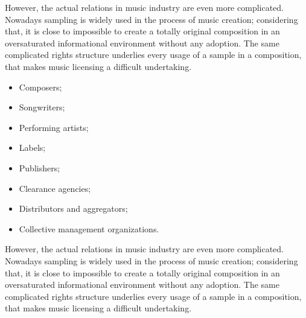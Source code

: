 \documentclass[12pt]{report}
\begin{document}
\begin{figure}[H]
\end{figure}

However, the actual relations in music industry are even more complicated. Nowadays sampling is widely used in the process of music creation; considering that, it is close to impossible to create a totally original composition in an oversaturated informational environment without any adoption. The same complicated rights structure underlies every usage of a sample in a composition, that makes music licensing a difficult undertaking.

\begin{itemize}
	\item Composers;
	\item Songwriters;
	\item Performing artists;
	\item Labels;
	\item Publishers;
	\item Clearance agencies;
	\item Distributors and aggregators;
	\item Collective management organizations.
\end{itemize}
	
However, the actual relations in music industry are even more complicated. Nowadays sampling is widely used in the process of music creation; considering that, it is close to impossible to create a totally original composition in an oversaturated informational environment without any adoption. The same complicated rights structure underlies every usage of a sample in a composition, that makes music licensing a difficult undertaking.
\end{document}
